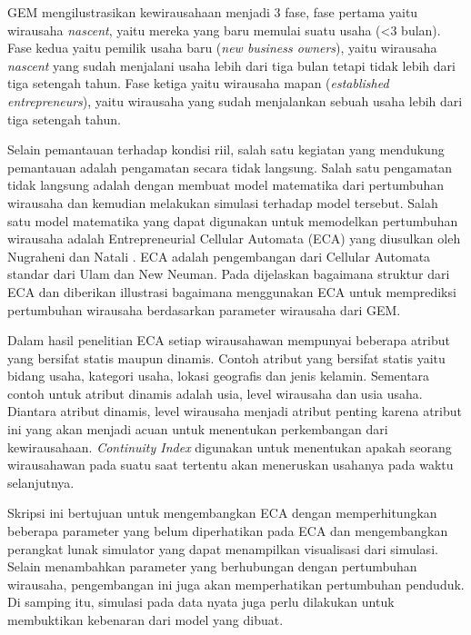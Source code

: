 \documentclass[a4paper,twoside]{article}
\begin{document}
GEM mengilustrasikan kewirausahaan menjadi 3 fase, fase pertama yaitu wirausaha \textit{nascent}, yaitu mereka yang baru memulai suatu usaha (<3 bulan). Fase kedua yaitu pemilik usaha baru (\textit{new business owners}), yaitu wirausaha \textit{nascent} yang sudah menjalani usaha lebih dari tiga bulan tetapi tidak lebih dari tiga setengah tahun. Fase ketiga yaitu wirausaha mapan (\textit{established entrepreneurs}), yaitu wirausaha yang sudah menjalankan sebuah usaha lebih dari tiga setengah tahun.


Selain pemantauan terhadap kondisi riil, salah satu kegiatan yang mendukung pemantauan adalah pengamatan secara tidak langsung. Salah satu pengamatan tidak langsung adalah dengan membuat model matematika dari pertumbuhan wirausaha dan kemudian melakukan simulasi terhadap model tersebut. Salah satu model matematika yang dapat digunakan untuk memodelkan pertumbuhan wirausaha adalah Entrepreneurial Cellular Automata (ECA) yang diusulkan oleh Nugraheni dan Natali \footnotemark. ECA adalah pengembangan dari Cellular Automata standar dari Ulam dan New Neuman. Pada \footnotemark[\value{footnote}
] dijelaskan bagaimana struktur dari ECA dan diberikan illustrasi bagaimana menggunakan ECA untuk memprediksi pertumbuhan wirausaha berdasarkan parameter wirausaha dari GEM. 

Dalam hasil penelitian ECA setiap wirausahawan mempunyai beberapa atribut yang bersifat statis maupun dinamis. Contoh atribut yang bersifat statis yaitu bidang usaha, kategori usaha, lokasi geografis dan jenis kelamin. Sementara contoh untuk atribut dinamis adalah usia, level wirausaha dan usia usaha. Diantara atribut dinamis, level wirausaha menjadi atribut penting karena atribut ini yang akan menjadi acuan untuk menentukan perkembangan dari kewirausahaan. \textit{Continuity Index} digunakan untuk menentukan apakah seorang wirausahawan pada suatu saat tertentu akan meneruskan usahanya pada waktu selanjutnya.


Skripsi ini bertujuan untuk mengembangkan ECA dengan memperhitungkan beberapa parameter yang belum diperhatikan pada ECA dan mengembangkan perangkat lunak simulator yang dapat menampilkan visualisasi dari simulasi. Selain menambahkan parameter yang berhubungan dengan pertumbuhan wirausaha, pengembangan ini juga akan memperhatikan pertumbuhan penduduk. Di samping itu, simulasi pada data nyata juga perlu dilakukan untuk membuktikan kebenaran dari model yang dibuat.

\end{document}
